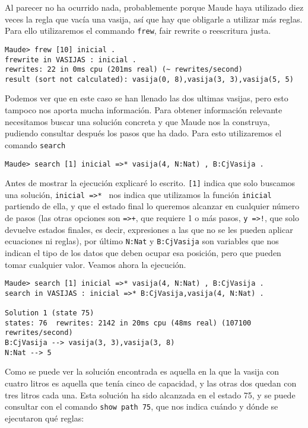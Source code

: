 Al parecer no ha ocurrido nada, probablemente porque Maude haya utilizado diez veces la regla que vacía una vasija, así que hay que obligarle a utilizar más reglas. Para ello utilizaremos el commando \texttt{frew}, fair rewrite o reescritura justa.\par

{\codesize
\begin{verbatim}
Maude> frew [10] inicial .
frewrite in VASIJAS : inicial .
rewrites: 22 in 0ms cpu (201ms real) (~ rewrites/second)
result (sort not calculated): vasija(0, 8),vasija(3, 3),vasija(5, 5)
\end{verbatim}
}

Podemos ver que en este caso se han llenado las dos ultimas vasijas, pero esto tampoco nos aporta mucha información. Para obtener información relevante necesitamos buscar una solución concreta y que Maude nos la construya, pudiendo consultar después los pasos que ha dado. Para esto utilizaremos el comando \texttt{search}

{\codesize
\begin{verbatim}
Maude> search [1] inicial =>* vasija(4, N:Nat) , B:CjVasija .
\end{verbatim}
}

Antes de mostrar la ejecución explicaré lo escrito. \verb"[1]" indica que solo buscamos una solución, \verb"inicial =>* " nos indica que utilizamos la función \texttt{inicial} partiendo de ella, y que el estado final lo queremos alcanzar en cualquier número de pasos (las otras opciones son \verb"=>+", que requiere 1 o más pasos, \verb"y =>!", que solo devuelve estados finales, es decir, expresiones
a las que no se les pueden aplicar ecuaciones ni reglas), por último \verb"N:Nat" y \verb"B:CjVasija" son variables que nos indican el tipo de los datos que deben ocupar esa posición, pero que pueden tomar cualquier valor. Veamos ahora la ejecución.\par

{\codesize
\begin{verbatim}
Maude> search [1] inicial =>* vasija(4, N:Nat) , B:CjVasija .
search in VASIJAS : inicial =>* B:CjVasija,vasija(4, N:Nat) .

Solution 1 (state 75)
states: 76  rewrites: 2142 in 20ms cpu (48ms real) (107100 rewrites/second)
B:CjVasija --> vasija(3, 3),vasija(3, 8)
N:Nat --> 5
\end{verbatim}
}

Como se puede ver la solución encontrada es aquella en la que la vasija con cuatro litros es aquella que tenía cinco de capacidad, y las otras dos quedan con tres litros cada una. Esta solución ha sido alcanzada en el estado 75, y se puede consultar con el comando \verb"show path 75", que nos indica cuándo y dónde se ejecutaron qué reglas: \par

